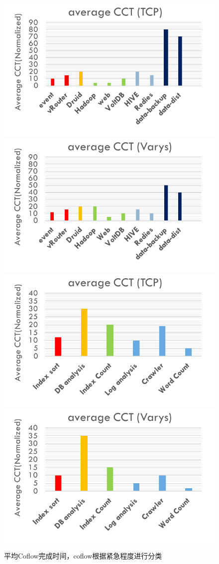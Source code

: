 \begin{figure}[h]
  \centering%
    {\includegraphics[width=0.5\columnwidth]{figures/Yosemite/figs/motivation/motivation_color_1.pdf}}%
      {\includegraphics[width=0.5\columnwidth]{figures/Yosemite/figs/motivation/motivation_color_2.pdf}}
    {\includegraphics[width=0.5\columnwidth]{figures/Yosemite/figs/motivation/motivation_color_3.pdf}}%
      {\includegraphics[width=0.5\columnwidth]{figures/Yosemite/figs/motivation/motivation_color_4.pdf}}
  \caption{平均Coflow完成时间，coflow根据紧急程度进行分类}
  \label{Yosemite_Motivation_fig1}
\end{figure}


